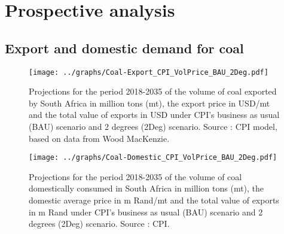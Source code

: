 \documentclass[12pt,english]{article}
\begin{document}
\clearpage
\section{Prospective analysis}

\subsection{Export and domestic demand for coal}



\begin{figure}[!t]
	\centering
	\texttt{[image: ../graphs/Coal-Export\_CPI\_VolPrice\_BAU\_2Deg.pdf]}
	\caption{\label{Coal-Export_CPI_VolPrice_BAU_2Deg}\small Projections for the period 2018-2035 of the volume of coal exported by South Africa in million tons (mt), the export price in USD/mt and the total value of exports in USD under CPI's business as usual (BAU) scenario and 2 degrees (2Deg) scenario. Source : CPI model, based on data from Wood MacKenzie.}
\end{figure}

\begin{figure}[!t]
	\centering
	\texttt{[image: ../graphs/Coal-Domestic\_CPI\_VolPrice\_BAU\_2Deg.pdf]}
	\caption{\label{Coal-Domestic_CPI_VolPrice_BAU_2Deg}\small Projections for the period 2018-2035 of the volume of coal domestically consumed in South Africa in million tons (mt), the domestic average price in m Rand/mt and the total value of exports in m Rand under CPI's business as usual (BAU) scenario and 2 degrees (2Deg) scenario. Source : CPI.}
\end{figure}
\end{document}
